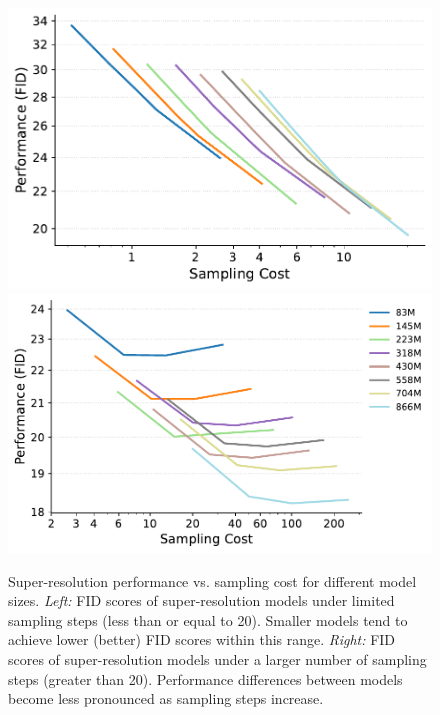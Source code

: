 \begin{figure}[t]
    \centering
    \def\xwidth{.315\linewidth}
    \includegraphics[height=\xwidth]{cp2/figures/sr_fid_cost_l_20steps.pdf}
    \includegraphics[height=\xwidth]{cp2/figures/sr_fid_cost_g_50steps.pdf}
    \vspace{-1.5\baselineskip}
    \caption{Super-resolution performance vs. sampling cost for different model sizes. \emph{Left:} FID scores of super-resolution models under limited sampling steps (less than or equal to 20). Smaller models tend to achieve lower (better) FID scores within this range.
    \emph{Right:} FID scores of super-resolution models under a larger number of sampling steps (greater than 20).
    Performance differences between models become less pronounced as sampling steps increase.
%
    }
    \label{fig:sroptiamlrules}
    \vspace{-1\baselineskip}
\end{figure}


